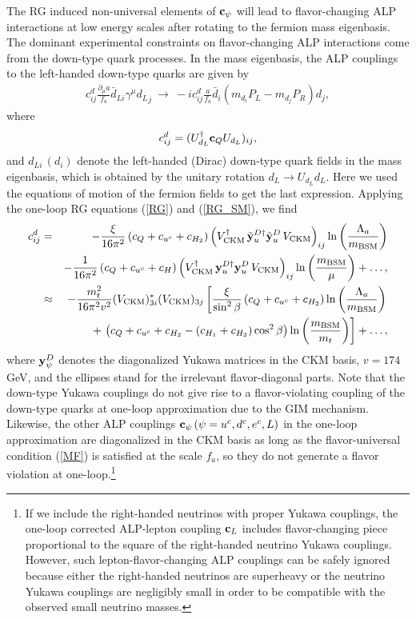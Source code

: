 \documentclass[preprint,prd,aps,tighten,nofootinbib,amssymb]{revtex4}
\newcommand{\bea}{\begin{eqnarray}}
\newcommand{\eea}{\end{eqnarray}}
\newcommand{\dis}[1]{\begin{equation}\begin{split}#1\end{split}\end{equation}}
\def\vpq{f_{a}}
\newcommand{\C}{\bold c}
\newcommand{\Y}{\tilde{\bold  y}}
\newcommand{\y}{\bold y}
\begin{document}
The RG induced non-universal elements of $\C_\psi$ will lead to flavor-changing ALP interactions at low energy scales after rotating to the fermion mass eigenbasis.
The dominant experimental constraints on flavor-changing ALP interactions come from the down-type quark processes. In the mass eigenbasis, the ALP couplings to the left-handed down-type quarks are given by
\dis{
 c^d_{ij}\frac{\partial_\mu a}{\vpq}   \bar{d}_{L i} \gamma^\mu  {d_L}_j ~\rightarrow~ -i  c^d_{ij} \frac{a}{\vpq}
 \bar{d}_i \left(m_{d_i} P_L - m_{d_j} P_R \right) d_j,
}
where 
\bea
c^d_{ij}=(U_{d_L}^\dagger \C_Q U_{d_L})_{ij},
\eea
and $d_{L i} \, (d_i)$ denote the left-handed (Dirac) down-type quark fields in the mass eigenbasis, which is obtained by the unitary rotation $d_{L} \rightarrow U_{d_L} d_{L}.$
Here we used the equations of motion of the fermion fields to get the last expression.   
Applying the one-loop RG equations (\ref{RG}) and (\ref{RG_SM}), we find
\bea
\label{fcnc_down}
c^d_{ij}&=&  -\frac{\xi}{16\pi^2} \left(c_Q+c_{u^c} +c_{H_2}\right)\left(V_{\rm CKM}^\dagger \, \Y_{u}^{D \dagger} \Y_{u}^D \, V_{\rm CKM} \right)_{ij} \ln\left(\frac{\Lambda_a}{m_{\rm BSM}}\right) \nonumber \\
&&-\frac{1}{16\pi^2} \left(c_Q+c_{u^c} +c_{H}\right)\left(V_{\rm CKM}^\dagger \, \y_{u}^{D \dagger} \y_{u}^D \, V_{\rm CKM}  \right)_{ij} \ln\left(\frac{m_{\rm BSM}}{\mu}\right) + \dots,
\nonumber \\ 
&\approx&  -\frac{m_t^2}{16\pi^2 v^2} (V_{\rm CKM})_{3i}^* (V_{\rm CKM})_{3j}
\left[\frac{\xi}{\sin^2\beta} \left(c_Q+c_{u^c}+c_{H_2}\right)
 \ln\left(\frac{\Lambda_a}{m_{\rm BSM}}\right)\right.\nonumber \\
 &&\left.+\, \left(c_Q+c_{u^c}+c_{H_2}-(c_{H_1}+c_{H_2})\cos^2\beta\right)\ln\left(\frac{m_{\rm BSM}}{m_t}\right) 
 \right] + \dots,
 \label{downTypeQuarkALPcoup}
\eea
where $\y_\psi^D$ denotes the diagonalized Yukawa matrices in the CKM basis, $v= 174$ GeV, and the ellipses stand for the irrelevant flavor-diagonal parts.
Note  that the down-type Yukawa couplings do not give rise to a flavor-violating coupling of the down-type quarks at one-loop approximation due to the GIM mechanism.
Likewise, the other ALP couplings  $\C_\psi \, (\psi = u^c, d^c, e^c, L)$ in the one-loop approximation  are diagonalized in the CKM basis as long as the flavor-universal condition (\ref{MF}) is satisfied at the scale $\vpq$, so they do not generate a flavor violation at one-loop.\footnote{If we include the right-handed neutrinos with proper Yukawa couplings, the one-loop corrected ALP-lepton coupling $\C_L$ includes flavor-changing piece proportional to the square of the right-handed neutrino Yukawa couplings.
 However, such lepton-flavor-changing ALP couplings can be safely ignored because either the right-handed neutrinos are superheavy or the neutrino Yukawa couplings are negligibly  small in order to be compatible with the observed small neutrino masses.}
\end{document}
